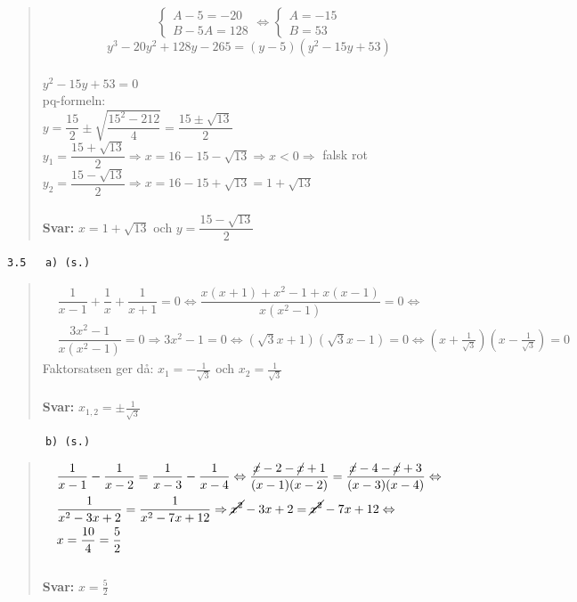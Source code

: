 \documentclass[a4paper]{article}
\newcommand{\tskcol}[1]{\textcolor{tskcol}{#1}}
\begin{document}
\begin{quotation}
		\[\begin{cases}
		A-5=-20 \\
		B-5A=128
		\end{cases}
		\Leftrightarrow
		\begin{cases}
		A=-15 \\
		B=53
		\end{cases}\]
		\[y^3-20y^2+128y-265=(y-5)(y^2-15y+53)\] \\
		$y^2-15y+53=0$ \\
		pq-formeln: \\
		$y=\dfrac{15}{2}\pm\sqrt{\dfrac{15^2-212}{4}}=\dfrac{15\pm\sqrt{13}}{2}$ \\
		$y_1=\dfrac{15+\sqrt{13}}{2} \Rightarrow 
		x=16-15-\sqrt{13} \Rightarrow 
		x < 0 \Rightarrow$ falsk rot \\
		$y_2=\dfrac{15-\sqrt{13}}{2} \Rightarrow x=16-15+\sqrt{13}=1+\sqrt{13}$ \\ \\
		\textbf{Svar:} $x=1+\sqrt{13}$ och $y=\dfrac{15-\sqrt{13}}{2}$
	\end{quotation}
	
	\pagebreak
	\texttt{\tskcol{3.5~~~a) (s.)}}
	\begin{quotation}
		\noindent
		\begin{align*}
		&\dfrac{1}{x-1}+\dfrac{1}{x}+\dfrac{1}{x+1}=0\Leftrightarrow
		\dfrac{x(x+1)+x^2-1+x(x-1)}{x(x^2-1)}=0 \Leftrightarrow \\
		&\dfrac{3x^2-1}{x(x^2-1)}=0\Rightarrow 
		3x^2-1=0 \Leftrightarrow 
		(\sqrt{3}x+1)(\sqrt{3}x-1)=0 \Leftrightarrow
		(x+\frac{1}{\sqrt{3}})(x-\frac{1}{\sqrt{3}})=0
		\end{align*}
		Faktorsatsen ger då: $x_1=-\frac{1}{\sqrt{3}}$ och $x_2=\frac{1}{\sqrt{3}}$
		\\ \\
		\textbf{Svar:} $x_{1,2}=\pm\frac{1}{\sqrt{3}}$
	\end{quotation}
	
	\texttt{\tskcol{~~~~~~b) (s.)}}
	\begin{quotation}
		\noindent
		\begin{align*}
		&\dfrac{1}{x-1}-\dfrac{1}{x-2}=\dfrac{1}{x-3}-\dfrac{1}{x-4}\Leftrightarrow 
		\dfrac{\cancel{x}-2-\cancel{x}+1}{(x-1)(x-2)}=\dfrac{\cancel{x}-4-\cancel{x}+3}{(x-3)(x-4)} \Leftrightarrow \\
		&\dfrac{1}{x^2-3x+2}=\dfrac{1}{x^2-7x+12} \Rightarrow
		\cancel{x^2}-3x+2=\cancel{x^2}-7x+12 \Leftrightarrow \\
		&x=\frac{10}{4}=\frac{5}{2}
		\end{align*}
		\\
		\textbf{Svar:} $x=\frac{5}{2}$
	\end{quotation}
	
\end{document}
